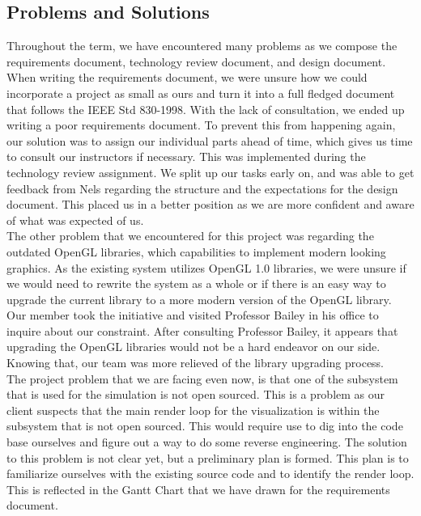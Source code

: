 \documentclass[10pt,journal,compsoc,draftclsnofoot]{IEEEtran}
\begin{document}
\begin{flushleft}
\section{Problems and Solutions}
Throughout the term, we have encountered many problems as we compose the requirements document, technology review document, and design document.
When writing the requirements document, we were unsure how we could incorporate a project as small as ours and turn it into a full fledged document that follows the IEEE Std 830-1998.
With the lack of consultation, we ended up writing a poor requirements document.
To prevent this from happening again, our solution was to assign our individual parts ahead of time, which gives us time to consult our instructors if necessary.
This was implemented during the technology review assignment.
We split up our tasks early on, and was able to get feedback from Nels regarding the structure and the expectations for the design document.
This placed us in a better position as we are more confident and aware of what was expected of us. \\
\vspace{3mm}
The other problem that we encountered for this project was regarding the outdated OpenGL libraries, which capabilities to implement modern looking graphics.
As the existing system utilizes OpenGL 1.0 libraries, we were unsure if we would need to rewrite the system as a whole or if there is an easy way to upgrade the current library to a more modern version of the OpenGL library.
Our member took the initiative and visited Professor Bailey in his office to inquire about our constraint.
After consulting Professor Bailey, it appears that upgrading the OpenGL libraries would not be a hard endeavor on our side.
Knowing that, our team was more relieved of the library upgrading process. \\
\vspace{3mm}
The project problem that we are facing even now, is that one of the subsystem that is used for the simulation is not open sourced.
This is a problem as our client suspects that the main render loop for the visualization is within the subsystem that is not open sourced.
This would require use to dig into the code base ourselves and figure out a way to do some reverse engineering.
The solution to this problem is not clear yet, but a preliminary plan is formed.
This plan is to familiarize ourselves with the existing source code and to identify the render loop.
This is reflected in the Gantt Chart that we have drawn for the requirements document. \\


\end{flushleft}
\end{document}
